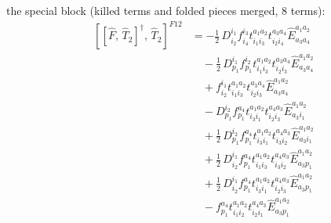 \documentclass[11pt]{article}
\begin{document}
the special block (killed terms and folded pieces merged, 8 terms):
\begin{align}
\left[\left[\hat{F},\, \hat{T}_{2}\right]^{\dagger},\, \hat{T}_{2}\right]^{F12} &= - \tfrac{1}{2}\, D^{i_{1}}_{i_{2}} f^{i_{3}}_{i_{4}} t^{a_{1}a_{2}}_{i_{1}i_{3}} t^{a_{3}a_{4}}_{i_{2}i_{4}} \hat{E}^{a_{1}a_{2}}_{a_{3}a_{4}} \\
&\quad - \tfrac{1}{2}\, D^{i_{1}}_{p_{1}} f^{i_{2}}_{p_{1}} t^{a_{1}a_{2}}_{i_{1}i_{3}} t^{a_{3}a_{4}}_{i_{2}i_{3}} \hat{E}^{a_{1}a_{2}}_{a_{3}a_{4}} \\
&\quad + f^{i_{1}}_{i_{2}} t^{a_{1}a_{2}}_{i_{1}i_{3}} t^{a_{3}a_{4}}_{i_{2}i_{3}} \hat{E}^{a_{1}a_{2}}_{a_{3}a_{4}} \\
&\quad - D^{i_{2}}_{p_{1}} f^{a_{4}}_{p_{1}} t^{a_{1}a_{2}}_{i_{3}i_{1}} t^{a_{4}a_{3}}_{i_{2}i_{3}} \hat{E}^{a_{1}a_{2}}_{a_{3}i_{1}} \\
&\quad + \tfrac{1}{2}\, D^{i_{2}}_{p_{1}} f^{a_{4}}_{p_{1}} t^{a_{1}a_{2}}_{i_{3}i_{1}} t^{a_{4}a_{3}}_{i_{3}i_{2}} \hat{E}^{a_{1}a_{2}}_{a_{3}i_{1}} \\
&\quad + \tfrac{1}{2}\, D^{i_{1}}_{i_{2}} f^{a_{4}}_{p_{1}} t^{a_{1}a_{2}}_{i_{1}i_{3}} t^{a_{4}a_{3}}_{i_{3}i_{2}} \hat{E}^{a_{1}a_{2}}_{a_{3}p_{1}} \\
&\quad + \tfrac{1}{2}\, D^{i_{1}}_{i_{2}} f^{a_{4}}_{p_{1}} t^{a_{1}a_{2}}_{i_{3}i_{1}} t^{a_{4}a_{3}}_{i_{2}i_{3}} \hat{E}^{a_{1}a_{2}}_{a_{3}p_{1}} \\
&\quad - f^{a_{4}}_{p_{1}} t^{a_{1}a_{2}}_{i_{1}i_{2}} t^{a_{4}a_{3}}_{i_{2}i_{1}} \hat{E}^{a_{1}a_{2}}_{a_{3}p_{1}}
\end{align}
\end{document}
